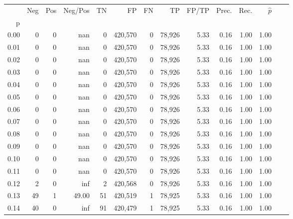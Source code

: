 \begin{tabular}{rrrrrrrrrrrrrr}
\toprule
{} &     Neg &    Pos & Neg/Pos &       TN &       FP &      FN &      TP & FP/TP & Prec. &  Rec. & $\hat{p}$ \\
p    &         &        &         &          &          &         &         &       &       &       &           \\
\midrule
0.00 &       0 &      0 &     nan &        0 &  420,570 &       0 &  78,926 &  5.33 &  0.16 &  1.00 &      1.00 \\
0.01 &       0 &      0 &     nan &        0 &  420,570 &       0 &  78,926 &  5.33 &  0.16 &  1.00 &      1.00 \\
0.02 &       0 &      0 &     nan &        0 &  420,570 &       0 &  78,926 &  5.33 &  0.16 &  1.00 &      1.00 \\
0.03 &       0 &      0 &     nan &        0 &  420,570 &       0 &  78,926 &  5.33 &  0.16 &  1.00 &      1.00 \\
0.04 &       0 &      0 &     nan &        0 &  420,570 &       0 &  78,926 &  5.33 &  0.16 &  1.00 &      1.00 \\
0.05 &       0 &      0 &     nan &        0 &  420,570 &       0 &  78,926 &  5.33 &  0.16 &  1.00 &      1.00 \\
0.06 &       0 &      0 &     nan &        0 &  420,570 &       0 &  78,926 &  5.33 &  0.16 &  1.00 &      1.00 \\
0.07 &       0 &      0 &     nan &        0 &  420,570 &       0 &  78,926 &  5.33 &  0.16 &  1.00 &      1.00 \\
0.08 &       0 &      0 &     nan &        0 &  420,570 &       0 &  78,926 &  5.33 &  0.16 &  1.00 &      1.00 \\
0.09 &       0 &      0 &     nan &        0 &  420,570 &       0 &  78,926 &  5.33 &  0.16 &  1.00 &      1.00 \\
0.10 &       0 &      0 &     nan &        0 &  420,570 &       0 &  78,926 &  5.33 &  0.16 &  1.00 &      1.00 \\
0.11 &       0 &      0 &     nan &        0 &  420,570 &       0 &  78,926 &  5.33 &  0.16 &  1.00 &      1.00 \\
0.12 &       2 &      0 &     inf &        2 &  420,568 &       0 &  78,926 &  5.33 &  0.16 &  1.00 &      1.00 \\
0.13 &      49 &      1 &   49.00 &       51 &  420,519 &       1 &  78,925 &  5.33 &  0.16 &  1.00 &      1.00 \\
0.14 &      40 &      0 &     inf &       91 &  420,479 &       1 &  78,925 &  5.33 &  0.16 &  1.00 &      1.00 \\

\end{tabular}

